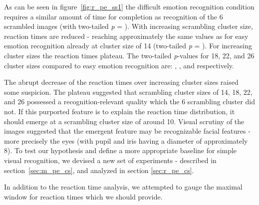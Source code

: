 	    As can be seen in figure~\ref{fig:r_pe_ss1} the difficult emotion recognition condition requires a similar amount of time for completion as recognition of the \SI{6}{\pixel} scrambled images 
	    (with two-tailed \textit{p} = ).
	    With increasing scrambling cluster size, reaction times are reduced - reaching approximately the same values as for easy emotion recognition already at cluster size of \SI{14}{\pixel}
	    (two-tailed \textit{p} = ).
	    For increasing cluster sizes the reaction times plateau. 
	    The two-tailed \textit{p}-values for \SI{18}{\pixel}, \SI{22}{\pixel}, and \SI{26}{\pixel} cluster sizes compared to easy emotion recognition are:
	    , , and  respectively.
	    
	    The abrupt decrease of the reaction times over increasing cluster sizes raised some suspicion.
	    The plateau suggested that scrambling cluster sizes of \SI{14}{\pixel}, \SI{18}{\pixel}, \SI{22}{\pixel}, and \SI{26}{\pixel} possessed a recognition-relevant quality which the \SI{6}{\pixel} scrambling cluster did not.
	    If this purported feature is to explain the reaction time distribution, it should emerge at a scrambling cluster size of around \SI{10}{\pixel}.
	    Visual scrutiny of the images suggested that the emergent feature may be recognizable facial features - more precisely the eyes (with pupil and iris having a diameter of approximately \SI{8}{\pixel}).
	    To test our hypothesis and define a more appropriate baseline for simple visual recognition, we devised a new set of experiments - described in section~\ref{sec:m_pe_cs}, and analyzed in section \ref{sec:r_pe_cs}.
	    
	    In addition to the reaction time analysis, we attempted to gauge the maximal window for reaction times which we should provide. 
